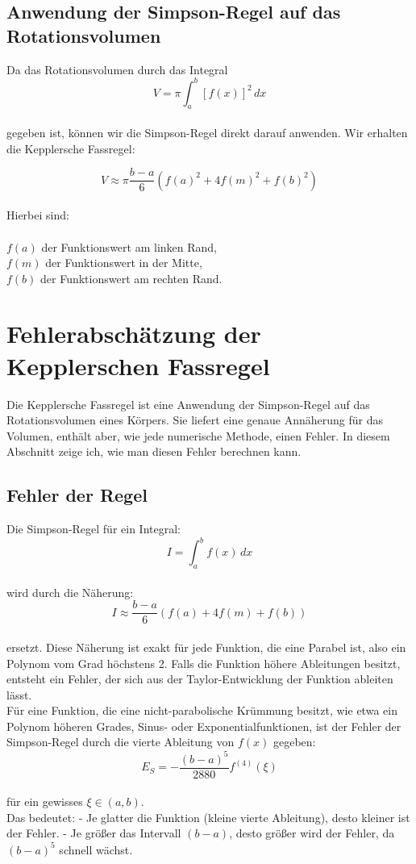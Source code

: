 \documentclass[a4paper,final]{report}
\begin{document}
\subsection{Anwendung der Simpson-Regel auf das Rotationsvolumen}

Da das Rotationsvolumen durch das Integral 
\\
\[
V = \pi \int_a^b [f(x)]^2 \, dx
\]
\\
gegeben ist, können wir die Simpson-Regel direkt darauf anwenden. Wir erhalten die Kepplersche Fassregel:

\[
V \approx \pi \frac{b-a}{6} \left( f(a)^2 + 4 f(m)^2 + f(b)^2 \right)
\]
\\
Hierbei sind: \\
\\ \( f(a) \) der Funktionswert am linken Rand,
\\ \( f(m) \) der Funktionswert in der Mitte,
\\ \( f(b) \) der Funktionswert am rechten Rand.


\newpage
\section{Fehlerabschätzung der Kepplerschen Fassregel}

Die Kepplersche Fassregel ist eine Anwendung der Simpson-Regel auf das Rotationsvolumen eines Körpers. Sie liefert eine genaue Annäherung für das Volumen, enthält aber, wie jede numerische Methode, einen Fehler. In diesem Abschnitt zeige ich, wie man diesen Fehler berechnen kann.

\subsection{Fehler der Regel}
Die Simpson-Regel für ein Integral:
\[
I = \int_a^b f(x) \, dx
\]
\\
wird durch die Näherung:
\\
\[
I \approx \frac{b-a}{6} \left( f(a) + 4f(m) + f(b) \right)
\]
\\
ersetzt. Diese Näherung ist exakt für jede Funktion, die eine Parabel ist, also ein Polynom vom Grad höchstens 2. Falls die Funktion höhere Ableitungen besitzt, entsteht ein Fehler, der sich aus der Taylor-Entwicklung der Funktion ableiten lässt.
\\
Für eine Funktion, die eine nicht-parabolische Krümmung besitzt, wie etwa ein Polynom höheren Grades, Sinus- oder Exponentialfunktionen, ist der Fehler der Simpson-Regel durch die vierte Ableitung von \( f(x) \) gegeben:
\\
\[
E_S = -\frac{(b-a)^5}{2880} f^{(4)}(\xi)
\]
\\
für ein gewisses \( \xi \in (a,b) \).
\\
Das bedeutet:
- Je glatter die Funktion (kleine vierte Ableitung), desto kleiner ist der Fehler.
- Je größer das Intervall \( (b-a) \), desto größer wird der Fehler, da \( (b-a)^5 \) schnell wächst.
\end{document}
